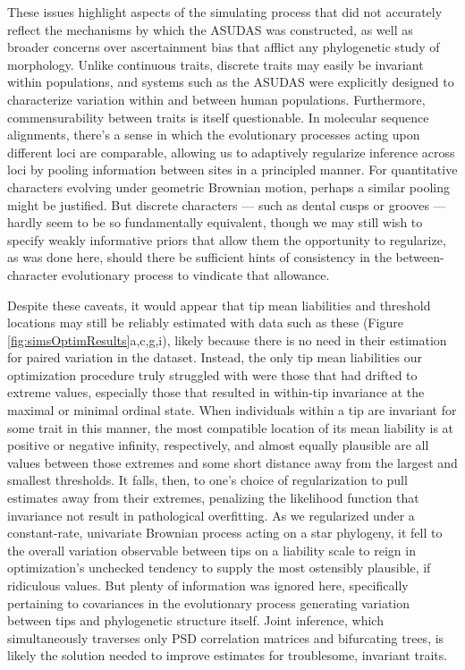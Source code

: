 \documentclass[10pt, twocolumn, twoside]{article}
\begin{document}
These issues highlight aspects of the simulating process that did not accurately reflect the mechanisms by which the ASUDAS was constructed, as well as broader concerns over ascertainment bias that afflict any phylogenetic study of morphology. Unlike continuous traits, discrete traits may easily be invariant within populations, and systems such as the ASUDAS were explicitly designed to characterize variation within and between human populations. Furthermore, commensurability between traits is itself questionable. In molecular sequence alignments, there's a sense in which the evolutionary processes acting upon different loci are comparable, allowing us to adaptively regularize inference across loci by pooling information between sites in a principled manner. For quantitative characters evolving under geometric Brownian motion, perhaps a similar pooling might be justified. But discrete characters --- such as dental cusps or grooves --- hardly seem to be so fundamentally equivalent, though we may still wish to specify weakly informative priors that allow them the opportunity to regularize, as was done here, should there be sufficient hints of consistency in the between-character evolutionary process to vindicate that allowance.

Despite these caveats, it would appear that tip mean liabilities and threshold locations may still be reliably estimated with data such as these (Figure \ref{fig:simsOptimResults}a,c,g,i), likely because there is no need in their estimation for paired variation in the dataset. Instead, the only tip mean liabilities our optimization procedure truly struggled with were those that had drifted to extreme values, especially those that resulted in within-tip invariance at the maximal or minimal ordinal state. When individuals within a tip are invariant for some trait in this manner, the most compatible location of its mean liability is at positive or negative infinity, respectively, and almost equally plausible are all values between those extremes and some short distance away from the largest and smallest thresholds. It falls, then, to one's choice of regularization to pull estimates away from their extremes, penalizing the likelihood function that invariance not result in pathological overfitting. As we regularized under a constant-rate, univariate Brownian process acting on a star phylogeny, it fell to the overall variation observable between tips on a liability scale to reign in optimization's unchecked tendency to supply the most ostensibly plausible, if ridiculous values. But plenty of information was ignored here, specifically pertaining to covariances in the evolutionary process generating variation between tips and phylogenetic structure itself. Joint inference, which simultaneously traverses only PSD correlation matrices and bifurcating trees, is likely the solution needed to improve estimates for troublesome, invariant traits.
\end{document}
